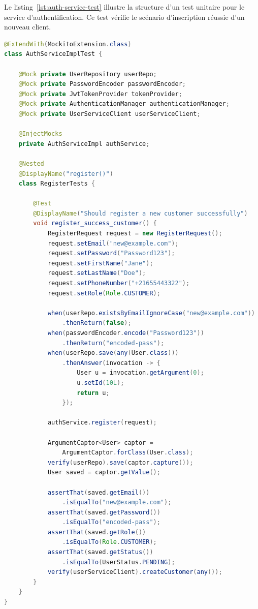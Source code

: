 Le listing~\ref{lst:auth-service-test} illustre la structure d'un test unitaire pour
le service d'authentification. Ce test vérifie le scénario d'inscription réussie
d'un nouveau client.

\begin{lstlisting}[language=Java, caption={Test d'inscription -- AuthServiceImplTest.java}, label={lst:auth-service-test}]
@ExtendWith(MockitoExtension.class)
class AuthServiceImplTest {

    @Mock private UserRepository userRepo;
    @Mock private PasswordEncoder passwordEncoder;
    @Mock private JwtTokenProvider tokenProvider;
    @Mock private AuthenticationManager authenticationManager;
    @Mock private UserServiceClient userServiceClient;

    @InjectMocks
    private AuthServiceImpl authService;

    @Nested
    @DisplayName("register()")
    class RegisterTests {

        @Test
        @DisplayName("Should register a new customer successfully")
        void register_success_customer() {
            RegisterRequest request = new RegisterRequest();
            request.setEmail("new@example.com");
            request.setPassword("Password123");
            request.setFirstName("Jane");
            request.setLastName("Doe");
            request.setPhoneNumber("+21655443322");
            request.setRole(Role.CUSTOMER);

            when(userRepo.existsByEmailIgnoreCase("new@example.com"))
                .thenReturn(false);
            when(passwordEncoder.encode("Password123"))
                .thenReturn("encoded-pass");
            when(userRepo.save(any(User.class)))
                .thenAnswer(invocation -> {
                    User u = invocation.getArgument(0);
                    u.setId(10L);
                    return u;
                });

            authService.register(request);

            ArgumentCaptor<User> captor =
                ArgumentCaptor.forClass(User.class);
            verify(userRepo).save(captor.capture());
            User saved = captor.getValue();

            assertThat(saved.getEmail())
                .isEqualTo("new@example.com");
            assertThat(saved.getPassword())
                .isEqualTo("encoded-pass");
            assertThat(saved.getRole())
                .isEqualTo(Role.CUSTOMER);
            assertThat(saved.getStatus())
                .isEqualTo(UserStatus.PENDING);
            verify(userServiceClient).createCustomer(any());
        }
    }
}
\end{lstlisting}

